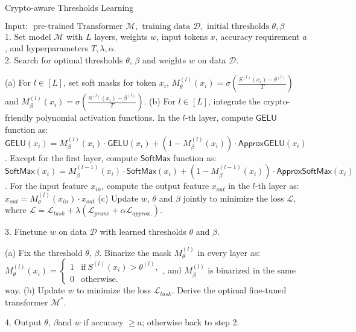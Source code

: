\begin{algorithm}[t!]
\caption{Crypto-aware Thresholds Learning}
\label{alg:threshold}
\footnotesize
$\text{Input: }
\text{ pre-trained Transformer } \mathcal{M},
\text{ training data } \mathcal{D},
\text{ initial thresholds } \theta, \beta \text{}
$\\
1. Set model $\mathcal{M}$ with $L$ layers, weights $w$, input tokens $x$, accuracy requirement $a$, and hyperparameters $T, \lambda, \alpha$.\\
2. Search for optimal thresholds $\theta$, $\beta$ and weights $w$ on data $\mathcal{D}$.
\begin{algorithmic}
\STATE (a) For $l \in [L]$, set soft masks for token $x_i$, $M^{(l)}_{\theta}(x_i) = \sigma (\frac{S^{(l)}(x_i)-\theta^{(l)}}{T})$ and $M^{(l)}_{\beta}(x_i) =\sigma (\frac{S^{(l)}(x_i)-\beta^{(l)}}{T})$.
\STATE (b) For $l \in [L]$, integrate the crypto-friendly polynomial activation functions. In the $l$-th layer, compute $\mathsf{GELU}$ function as: $\mathsf{GELU}(x_i) = M_{\beta}^{(l)}(x_i)\cdot \mathsf{GELU}(x_i) + (1-M_{\beta}^{(l)}(x_i))\cdot \mathsf{ApproxGELU}(x_i)$.
Except for the first layer, compute $\mathsf{SoftMax}$ function as: $\mathsf{SoftMax}(x_i) = M_{\beta}^{(l-1)}(x_i)\cdot \mathsf{SoftMax}(x_i) + (1-M_{\beta}^{(l-1)}(x_i))\cdot \mathsf{ApproxSoftMax}(x_i)$.
For the input feature $x_{in}$, compute the output feature $x_{out}$ in the $l$-th layer as: $x_{out} = M_{\theta}^{(l)}(x_{in})\cdot x_{out}$
\STATE (c) Update $w$, $\theta$ and $\beta$ jointly to minimize the loss $\mathcal{L}$, where $\mathcal{L} = \mathcal{L}_{task} + \lambda (\mathcal{L}_{prune} + \alpha \mathcal{L}_{approx.})$.\\
\end{algorithmic}
3. Finetune $w$ on data $\mathcal{D}$ with learned thresholds $\theta$ and  $\beta$.
\begin{algorithmic}
\STATE (a) Fix the threshold $\theta$, $\beta$. Binarize the mask $M^{(l)}_{\theta}$ in every layer as:
\STATE \hspace{\algorithmicindent} $M^{(l)}_{\theta}(x_i) = \begin{cases}
    1  &\text{if}\ S^{(l)}(x_i) > \theta^{(l)}, \\
    0  &\text{otherwise}.
\end{cases} $, and
$M^{(l)}_{\beta}$ is binarized in the same way.
\STATE (b) Update $w$ to minimize the loss $\mathcal{L}_{task}$. Derive the optimal fine-tuned transformer $\mathcal{M}^*$.
\end{algorithmic}
4. Output  $\theta$, $\beta$and $w$ if accuracy $\geq a$; otherwise back to step 2. 
\end{algorithm}

